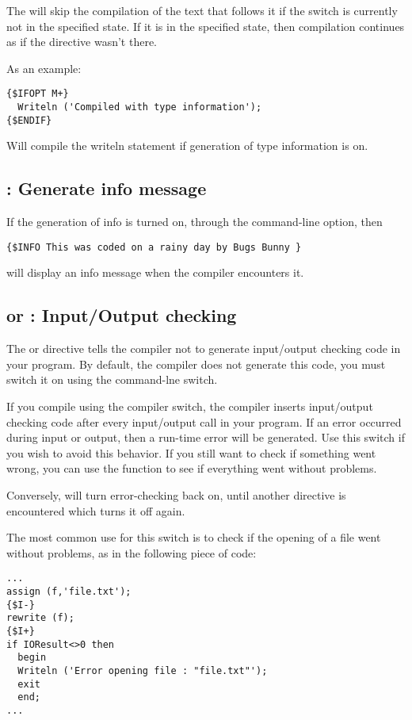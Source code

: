 \documentclass{report}
\begin{document}
The  will skip the compilation of the text that
follows it if the switch  is currently not in the specified 
state.  If it is in the specified state, then compilation continues as if the directive 
wasn't there. 

As an example:
\begin{verbatim}
{$IFOPT M+}
  Writeln ('Compiled with type information');
{$ENDIF}
\end{verbatim}
Will compile the writeln statement if generation of type information is on.

\subsection{ : Generate info message}

If the generation of info is turned on, through the  command-line
option, then 
\begin{verbatim}
{$INFO This was coded on a rainy day by Bugs Bunny }
\end{verbatim}
will display an info message when the compiler encounters it.


\subsection{ or  : Input/Output checking}
The  or  directive tells the compiler 
not to generate input/output checking code in your program. By default, the
compiler does not generate this code, you must switch it on using the
 command-lne switch.

If you compile using the  compiler switch, the \fpc compiler inserts input/output
checking code after every input/output call in your program. If an error
occurred during input or output, then a run-time error will be generated.
Use this switch if you wish to avoid this behavior.
If you still want to check if something went wrong, you can use the
 function to see if everything went without problems.

Conversely,  will turn error-checking back on, until another
directive is encountered which turns it off again.

The most common use for this switch is to check if the opening of a file
went without problems, as in the following piece of code:
\begin{verbatim}
...
assign (f,'file.txt');
{$I-}
rewrite (f);
{$I+}
if IOResult<>0 then
  begin
  Writeln ('Error opening file : "file.txt"');
  exit
  end;
...
\end{verbatim}
\end{document}
